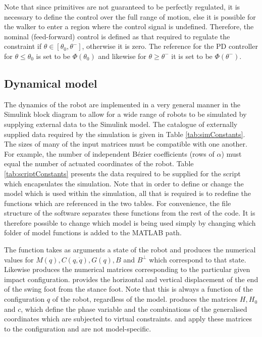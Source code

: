 Note that since primitives are not guaranteed to be perfectly regulated, it is necessary to define the control over the full range of motion, else it is possible for the walker to enter a region where the control signal is undefined. Therefore, the nominal (feed-forward) control is defined as that required to regulate the constraint if $\theta \in [\theta_0, \theta^-]$, otherwise it is zero. The reference for the PD controller for $\theta \leq \theta_0$ is set to be $\Phi(\theta_0)$ and likewise for $\theta \geq \theta^-$ it is set to be $\Phi(\theta^-)$.

\subsection{Dynamical model}
The dynamics of the robot are implemented in a very general manner in the Simulink block diagram to allow for a wide range of robots to be simulated by supplying external data to the Simulink model.
The catalogue of externally supplied data required by the simulation is given in Table \ref{tab:simConstants}. The sizes of many of the input matrices must be compatible with one another. For example, the number of independent Bézier coefficients (rows of $\alpha$) must equal the number of actuated coordinates of the robot. Table \ref{tab:scriptConstants} presents the data required to be supplied for the script which encapsulates the simulation. Note that in order to define or change the model which is used within the simulation, all that is required is to redefine the functions which are referenced in the two tables. For convenience, the file structure of the software separates these functions from the rest of the code. It is therefore possible to change which model is being used simply by changing which folder of model functions is added to the MATLAB path.

The  function takes as arguments a state of the robot and produces the numerical values for $M(q),C(q,\dot{q}),G(q),B$ and $B^\perp$ which correspond to that state. Likewise  produces the numerical matrices corresponding to the particular given impact configuration.  provides the horizontal and vertical displacement of the end of the swing foot from the stance foot. Note that this is always a function of the configuration $q$ of the robot, regardless of the model.  produces the matrices $H,H_0$ and $c$, which define the phase variable and the combinations of the generalised coordinates which are subjected to virtual constraints.  and  apply these matrices to the configuration and are not model-specific.

